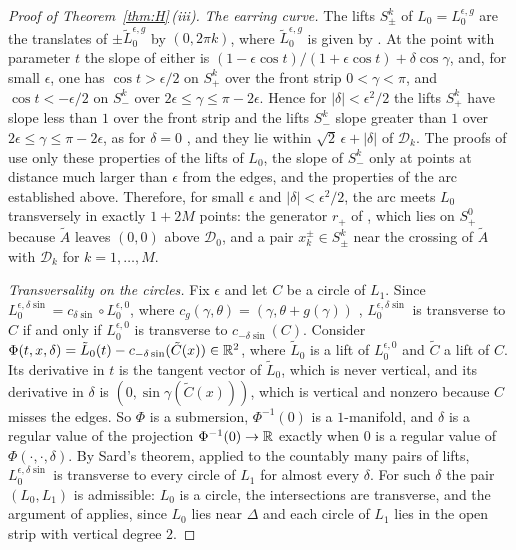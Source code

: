 \begin{proof}[Proof of Theorem~\ref{thm:H}\,(iii)]
\emph{The earring curve.} The lifts $S^k_\pm$ of $L_0=L_0^{\epsilon,g}$ are the translates of $\pm\tilde L_0^{\epsilon,g}$
by $(0,2\pi k)$, where $\tilde L_0^{\epsilon,g}$ is given by \cite[(13)]{HHK2}. At the point with parameter $t$ the slope
of either is $(1-\epsilon\cos t)/(1+\epsilon\cos t)+\delta\cos\gamma$, and, for small $\epsilon$, one has
$\cos t>\epsilon/2$ on $S^k_+$ over the front strip $0<\gamma<\pi$, and $\cos t<-\epsilon/2$ on $S^k_-$ over
$2\epsilon\le\gamma\le\pi-2\epsilon$. Hence for $|\delta|<\epsilon^2/2$ the lifts $S^k_+$ have slope less than $1$ over
the front strip and the lifts $S^k_-$ slope greater than $1$ over $2\epsilon\le\gamma\le\pi-2\epsilon$, as for
$\delta=0$ \cite[\S2.2]{WuebbenV}, and they lie within $\sqrt2\,\epsilon+|\delta|$ of $\mathcal D_k$. The proofs of
\cite[Cor.~5.3(4), Prop.~6.3 and Lemma~6.8]{WuebbenV} use only these properties of the lifts of $L_0$, the slope
of $S^k_-$ only at points at distance much larger than $\epsilon$ from the edges, and the
properties of the arc established above. Therefore, for small $\epsilon$ and $|\delta|<\epsilon^2/2$, the arc meets
$L_0$ transversely in exactly $1+2M$ points: the generator $r_+$ of \cite[Lemma~5.1]{HHK2}, which lies on $S^0_+$
because $\tilde A$ leaves $(0,0)$ above $\mathcal D_0$, and a pair $x_k^\pm\in S^k_\pm$ near the crossing of $\tilde A$ with
$\mathcal D_k$ for $k=1,\dots,M$.

\emph{Transversality on the circles.} Fix $\epsilon$ and let $C$ be a circle of $L_1$. Since
$L_0^{\epsilon,\delta\sin}=c_{\delta\sin}\circ L_0^{\epsilon,0}$, where $c_g(\gamma,\theta)=(\gamma,\theta+g(\gamma))$ \cite[(11), p.~18]{HHK2},
$L_0^{\epsilon,\delta\sin}$ is transverse to $C$ if and only if $L_0^{\epsilon,0}$ is transverse to $c_{-\delta\sin}(C)$.
Consider $\Phi(t,x,\delta)=\tilde L_0(t)-c_{-\delta\sin}(\tilde C(x))\in\mathbb{R}^2$, where $\tilde L_0$ is a lift of
$L_0^{\epsilon,0}$ and $\tilde C$ a lift of $C$. Its derivative in $t$ is the tangent vector of $\tilde L_0$, which is
never vertical, and its derivative in $\delta$ is $(0,\sin\gamma(\tilde C(x)))$, which is vertical and nonzero because
$C$ misses the edges. So $\Phi$ is a submersion, $\Phi^{-1}(0)$ is a $1$-manifold, and $\delta$ is a regular value of
the projection $\Phi^{-1}(0)\to\mathbb{R}$ exactly when $0$ is a regular value of $\Phi(\cdot,\cdot,\delta)$. By Sard's theorem,
applied to the countably many pairs of lifts, $L_0^{\epsilon,\delta\sin}$ is transverse to every circle of $L_1$ for
almost every $\delta$. For such $\delta$ the pair $(L_0,L_1)$ is admissible: $L_0$ is a circle, the intersections
are transverse, and the argument of \cite[Lemma~6.6]{WuebbenV} applies, since $L_0$ lies near $\Delta$ and each
circle of $L_1$ lies in the open strip with vertical degree $2$.


\end{proof}
